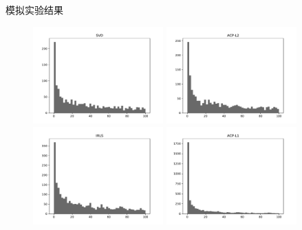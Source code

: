 \begin{frame}{模拟实验结果}
    \begin{figure}[H]
        \centering
        \begin{minipage}[t]{0.48\textwidth}
        \includegraphics[width=5cm]{pics/svd.pdf}
        \end{minipage}
        \begin{minipage}[t]{0.48\textwidth}
        \includegraphics[width=5cm]{pics/acp-l2.pdf}
        \end{minipage}
        \begin{minipage}[t]{0.48\textwidth}
        \includegraphics[width=5cm]{pics/IRLS.pdf}
        \end{minipage}
        \begin{minipage}[t]{0.48\textwidth}
        \includegraphics[width=5cm]{pics/acp-l1.pdf}
        \end{minipage}
    \end{figure}
\end{frame}


